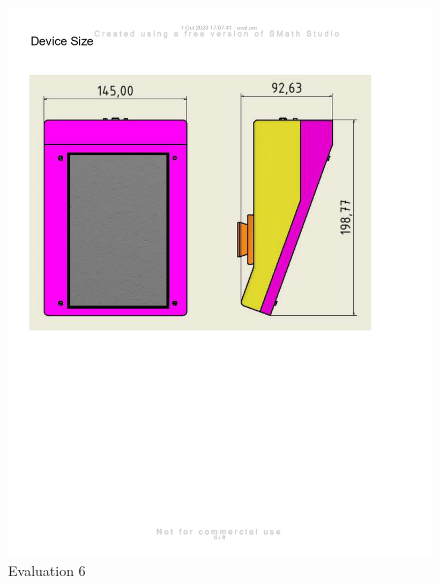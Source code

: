 \begin{figure}[H]
    \centering
    \includegraphics[width=\linewidth]{texs/appendix/data/evaluation/eval_page-0006.jpg}
    \caption{Evaluation 6}
    \label{fig:evaluation-6}
\end{figure}

